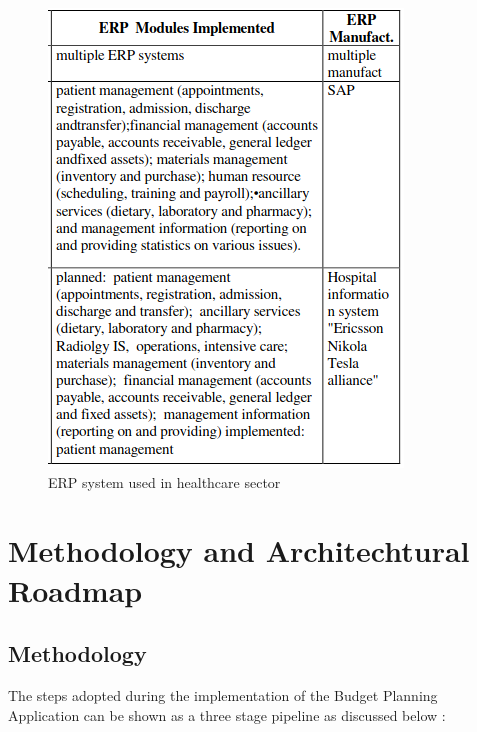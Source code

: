 \begin{figure}[H]
    \centering
        \includegraphics[scale=0.5]{Chapter1/Figures/ERP4.png}	
        \caption{ERP system used in healthcare sector }
        \label{fig:ERPHealthcare}
    \end{figure}
    

    \section[Methodology and Architechtural Roadmap]{\textbf{Methodology and Architechtural Roadmap}}
    
    \subsection{Methodology}
    The steps adopted during the implementation of the Budget Planning Application can
    be shown as a three stage pipeline as discussed below :
    
